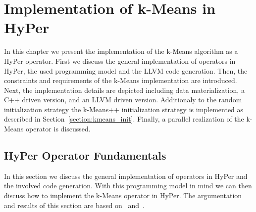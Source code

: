 \chapter{Implementation of k-Means in HyPer}\label{chapter:implementation}

In this chapter we present the implementation of the k-Means algorithm as a HyPer operator. First we discuss the general implementation of operators in HyPer, the used programming model and the LLVM code generation. Then, the constraints and requirements of the k-Means implementation are introduced. Next, the implementation details are depicted including data materialization, a C++ driven version, and an LLVM driven version. Additionaly to the random initialization strategy the k-Means++ initialization strategy is implemented as described in Section~\ref{section:kmeans_init}. Finally, a parallel realization of the k-Means operator is discussed.


\section{HyPer Operator Fundamentals}\label{section:operator}

In this section we discuss the general implementation of operators in HyPer and the involved code generation. With this programming model in mind we can then discuss how to implement the k-Means operator in HyPer. The argumentation and results of this section are based on~\parencite{neumann} and~\parencite{neumann+leis}.

